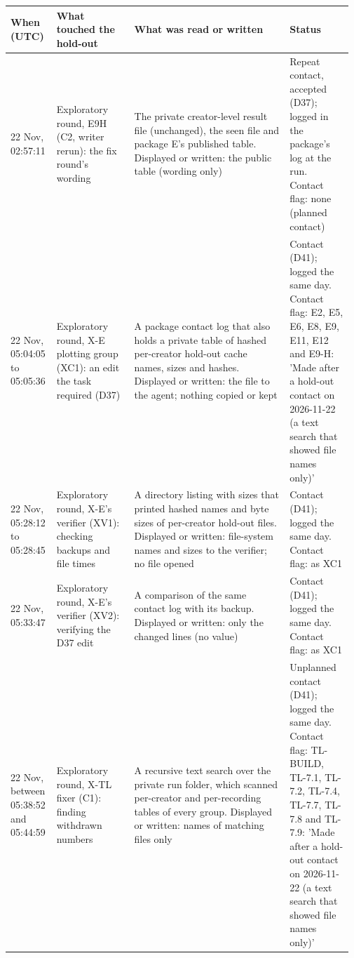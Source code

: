 {\scriptsize\setlength{\tabcolsep}{2pt}
\begin{tabular}{@{}p{0.13\linewidth}p{0.22\linewidth}p{0.44\linewidth}p{0.18\linewidth}@{}}
\toprule
When (UTC) & What touched the hold-out & What was read or written & Status \\
\midrule
22 Nov, 02:57:11 & Exploratory round, E9H (C2, writer rerun): the fix round's wording & The private creator-level result file (unchanged), the seen file and package E's published table. Displayed or written: the public table (wording only) & Repeat contact, accepted (D37); logged in the package's log at the run. Contact flag: none (planned contact) \\
22 Nov, 05:04:05 to 05:05:36 & Exploratory round, X-E plotting group (XC1): an edit the task required (D37) & A package contact log that also holds a private table of hashed per-creator hold-out cache names, sizes and hashes. Displayed or written: the file to the agent; nothing copied or kept & Contact (D41); logged the same day. Contact flag: E2, E5, E6, E8, E9, E11, E12 and E9-H: 'Made after a hold-out contact on 2026-11-22 (a text search that showed file names only)' \\
22 Nov, 05:28:12 to 05:28:45 & Exploratory round, X-E's verifier (XV1): checking backups and file times & A directory listing with sizes that printed hashed names and byte sizes of per-creator hold-out files. Displayed or written: file-system names and sizes to the verifier; no file opened & Contact (D41); logged the same day. Contact flag: as XC1 \\
22 Nov, 05:33:47 & Exploratory round, X-E's verifier (XV2): verifying the D37 edit & A comparison of the same contact log with its backup. Displayed or written: only the changed lines (no value) & Contact (D41); logged the same day. Contact flag: as XC1 \\
22 Nov, between 05:38:52 and 05:44:59 & Exploratory round, X-TL fixer (C1): finding withdrawn numbers & A recursive text search over the private run folder, which scanned per-creator and per-recording tables of every group. Displayed or written: names of matching files only & Unplanned contact (D41); logged the same day. Contact flag: TL-BUILD, TL-7.1, TL-7.2, TL-7.4, TL-7.7, TL-7.8 and TL-7.9: 'Made after a hold-out contact on 2026-11-22 (a text search that showed file names only)' \\

\end{tabular}}
